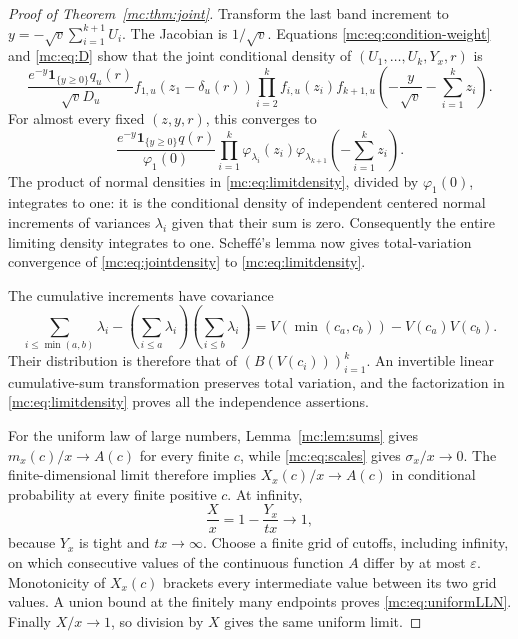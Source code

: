 \begin{proof}[Proof of Theorem~\ref{mc:thm:joint}]
Transform the last band increment to $y=-\sqrt v\sum_{i=1}^{k+1}U_i$.
The Jacobian is $1/\sqrt v$.  Equations
\eqref{mc:eq:condition-weight} and \eqref{mc:eq:D} show that the joint
conditional density of $(U_1,\ldots,U_k,Y_x,r)$ is
\begin{equation}\label{mc:eq:jointdensity}
 \frac{e^{-y}\mathbf1_{\{y\geq0\}}q_u(r)}{\sqrt vD_u}
 f_{1,u}(z_1-\delta_u(r))
 \prod_{i=2}^k f_{i,u}(z_i)
 f_{k+1,u}\left(-\frac{y}{\sqrt v}-\sum_{i=1}^kz_i\right).
\end{equation}
For almost every fixed $(z,y,r)$, this converges to
\begin{equation}\label{mc:eq:limitdensity}
 \frac{e^{-y}\mathbf1_{\{y\geq0\}}q(r)}{\varphi_1(0)}
 \prod_{i=1}^k\varphi_{\lambda_i}(z_i)
 \varphi_{\lambda_{k+1}}\left(-\sum_{i=1}^kz_i\right).
\end{equation}
The product of normal densities in \eqref{mc:eq:limitdensity}, divided
by $\varphi_1(0)$, integrates to one: it is the conditional density of
independent centered normal increments of variances $\lambda_i$ given
that their sum is zero.  Consequently the entire limiting density
integrates to one.  Scheff\'e's lemma now gives total-variation
convergence of \eqref{mc:eq:jointdensity} to
\eqref{mc:eq:limitdensity}.

The cumulative increments have covariance
\[
 \sum_{i\leq\min(a,b)}\lambda_i
 -\left(\sum_{i\leq a}\lambda_i\right)
  \left(\sum_{i\leq b}\lambda_i\right)
 =V(\min(c_a,c_b))-V(c_a)V(c_b).
\]
Their distribution is therefore that of $(B(V(c_i)))_{i=1}^k$.
An invertible linear cumulative-sum transformation preserves total
variation, and the factorization in \eqref{mc:eq:limitdensity} proves
all the independence assertions.

For the uniform law of large numbers, Lemma~\ref{mc:lem:sums} gives
$m_x(c)/x\to A(c)$ for every finite $c$, while
\eqref{mc:eq:scales} gives $\sigma_x/x\to0$.  The finite-dimensional
limit therefore implies $X_x(c)/x\to A(c)$ in conditional probability
at every finite positive $c$.  At infinity,
\[
 \frac Xx=1-\frac{Y_x}{tx}\longrightarrow1,
\]
because $Y_x$ is tight and $tx\to\infty$.  Choose a finite grid of
cutoffs, including infinity, on which consecutive values of the
continuous function $A$ differ by at most $\varepsilon$.  Monotonicity
of $X_x(c)$ brackets every intermediate value between its two grid
values.  A union bound at the finitely many endpoints proves
\eqref{mc:eq:uniformLLN}.  Finally $X/x\to1$, so division by $X$ gives
the same uniform limit.
\end{proof}


